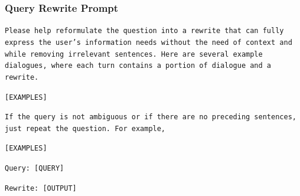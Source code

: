 \documentclass{article}
\begin{document}
\subsubsection{Query Rewrite Prompt}
\colorbox{prompt_gray}{\begin{minipage}{.98\textwidth}
\texttt{Please help reformulate the question into a rewrite that can fully express the user's information needs without the need of context and while removing irrelevant sentences. Here are several example dialogues, where each turn contains a portion of dialogue and a rewrite.}
\newline

\texttt{[EXAMPLES]}
\newline

\texttt{If the query is not ambiguous or if there are no preceding sentences, just repeat the question. For example,}
\newline

\texttt{[EXAMPLES]}
\newline

\texttt{Query: [QUERY]}

\texttt{Rewrite: [OUTPUT]}
\end{minipage}}
\end{document}
